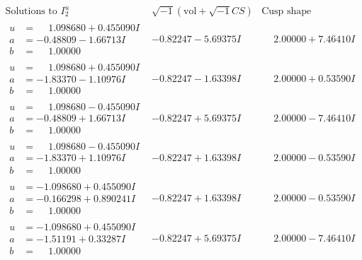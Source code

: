 \documentclass[1p]{elsarticle_modified}
\theoremstyle{definition}
\newcommand{\I}{\sqrt{-1}}
\begin{document}
$$\begin{array}{c|c|c}  
\text{Solutions to }I^u_{2}& \I (\text{vol} + \sqrt{-1}CS) & \text{Cusp shape}\\
 \hline 
\begin{aligned}
u &= \phantom{-}1.098680 + 0.455090 I \\
a &= -0.48809 - 1.66713 I \\
b &= \phantom{-}1.00000\phantom{ +0.000000I}\end{aligned}
 & -0.82247 - 5.69375 I & \phantom{-}2.00000 + 7.46410 I \\ \hline\begin{aligned}
u &= \phantom{-}1.098680 + 0.455090 I \\
a &= -1.83370 - 1.10976 I \\
b &= \phantom{-}1.00000\phantom{ +0.000000I}\end{aligned}
 & -0.82247 - 1.63398 I & \phantom{-}2.00000 + 0.53590 I \\ \hline\begin{aligned}
u &= \phantom{-}1.098680 - 0.455090 I \\
a &= -0.48809 + 1.66713 I \\
b &= \phantom{-}1.00000\phantom{ +0.000000I}\end{aligned}
 & -0.82247 + 5.69375 I & \phantom{-}2.00000 - 7.46410 I \\ \hline\begin{aligned}
u &= \phantom{-}1.098680 - 0.455090 I \\
a &= -1.83370 + 1.10976 I \\
b &= \phantom{-}1.00000\phantom{ +0.000000I}\end{aligned}
 & -0.82247 + 1.63398 I & \phantom{-}2.00000 - 0.53590 I \\ \hline\begin{aligned}
u &= -1.098680 + 0.455090 I \\
a &= -0.166298 + 0.890241 I \\
b &= \phantom{-}1.00000\phantom{ +0.000000I}\end{aligned}
 & -0.82247 + 1.63398 I & \phantom{-}2.00000 - 0.53590 I \\ \hline\begin{aligned}
u &= -1.098680 + 0.455090 I \\
a &= -1.51191 + 0.33287 I \\
b &= \phantom{-}1.00000\phantom{ +0.000000I}\end{aligned}
 & -0.82247 + 5.69375 I & \phantom{-}2.00000 - 7.46410 I \\ \hline\begin{aligned}

\end{aligned}
\end{array}$$
\end{document}
